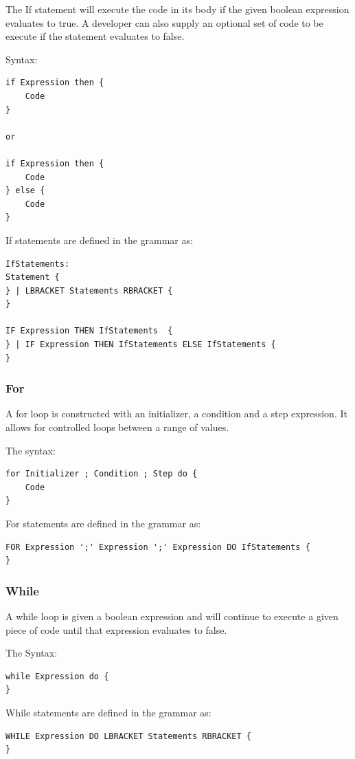 \documentclass[]{final_report}
\begin{document}
The If statement will execute the code in its body if the given boolean expression evaluates to true. A developer can also supply an optional set of code to be execute if the statement evaluates to false.

Syntax: 
\begin{verbatim}
if Expression then {
	Code
}

or

if Expression then {
	Code
} else {
	Code
}
\end{verbatim}

If statements are defined in the grammar as:
\begin{verbatim}
IfStatements: 
Statement {
} | LBRACKET Statements RBRACKET {
}

IF Expression THEN IfStatements  {
} | IF Expression THEN IfStatements ELSE IfStatements {
}
\end{verbatim}

\subsubsection{For}

A for loop is constructed with an initializer, a condition and a step expression. It allows for controlled loops between a range of values.

The syntax: \begin{verbatim}
for Initializer ; Condition ; Step do {
	Code
}
\end{verbatim}

For statements are defined in the grammar as: \begin{verbatim}
FOR Expression ';' Expression ';' Expression DO IfStatements {
}
\end{verbatim}

\subsubsection{While}

A while loop is given a boolean expression and will continue to execute a given piece of code until that expression evaluates to false.

The Syntax: \begin{verbatim}
while Expression do {
}
\end{verbatim}

While statements are defined in the grammar as: \begin{verbatim}
WHILE Expression DO LBRACKET Statements RBRACKET {
} 
\end{verbatim}
\end{document}
